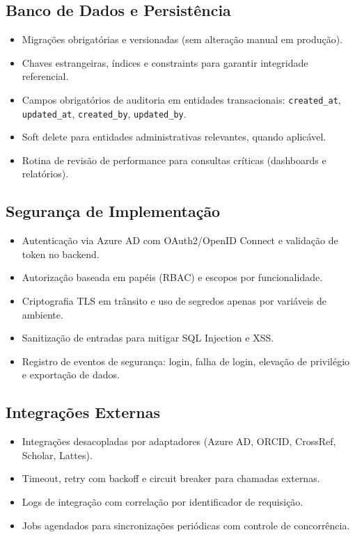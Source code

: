 \documentclass[12pt,a4paper]{article}
\begin{document}
\subsection{Banco de Dados e Persistência}
\begin{itemize}[leftmargin=*]
  \item Migrações obrigatórias e versionadas (sem alteração manual em produção).
  \item Chaves estrangeiras, índices e constraints para garantir integridade referencial.
  \item Campos obrigatórios de auditoria em entidades transacionais: \texttt{created\_at}, \texttt{updated\_at}, \texttt{created\_by}, \texttt{updated\_by}.
  \item Soft delete para entidades administrativas relevantes, quando aplicável.
  \item Rotina de revisão de performance para consultas críticas (dashboards e relatórios).
\end{itemize}

\subsection{Segurança de Implementação}
\begin{itemize}[leftmargin=*]
  \item Autenticação via Azure AD com OAuth2/OpenID Connect e validação de token no backend.
  \item Autorização baseada em papéis (RBAC) e escopos por funcionalidade.
  \item Criptografia TLS em trânsito e uso de segredos apenas por variáveis de ambiente.
  \item Sanitização de entradas para mitigar SQL Injection e XSS.
  \item Registro de eventos de segurança: login, falha de login, elevação de privilégio e exportação de dados.
\end{itemize}

\subsection{Integrações Externas}
\begin{itemize}[leftmargin=*]
  \item Integrações desacopladas por adaptadores (Azure AD, ORCID, CrossRef, Scholar, Lattes).
  \item Timeout, retry com backoff e circuit breaker para chamadas externas.
  \item Logs de integração com correlação por identificador de requisição.
  \item Jobs agendados para sincronizações periódicas com controle de concorrência.
\end{itemize}
\end{document}

